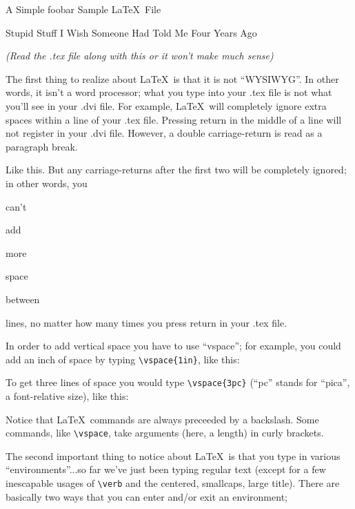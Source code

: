 \documentclass{article}
\begin{document}
\centerline{\sc \large A Simple foobar Sample \LaTeX\ File}
\vspace{.5pc}
\centerline{\sc Stupid Stuff I Wish Someone Had Told Me Four Years Ago}
\centerline{\it (Read the .tex file along with this or it won't 
            make much sense)}
\vspace{2pc}

The first thing to realize about \LaTeX\ is that it is not ``WYSIWYG''. 
In other words, it isn't a word processor; what you type into your 
.tex file is not what you'll see in your .dvi file.  For example, 
\LaTeX\ will      completely     ignore               extra
spaces    within                             a line of your .tex file.
Pressing return
in 
the 
middle 
of
a
line
will not register in your .dvi file. However, a double carriage-return
is read as a paragraph break.

Like this.  But any carriage-returns after the first two will be 
completely ignored; in other words, you 


can't 

add






more 




space 


between 




lines, no matter how many times you press return in your .tex file.

In order to add vertical space you have to use ``vspace''; for example, 
you could add an inch of space by typing \verb|\vspace{1in}|, like this:
\vspace{1in}

To get three lines of space you would type \verb|\vspace{3pc}|
(``pc'' stands for ``pica'', a font-relative size), like this:
\vspace{3pc}

Notice that \LaTeX\ commands are always preceeded by a backslash.  
Some commands, like \verb|\vspace|, take arguments (here, a length) in
curly brackets.  

The second important thing to notice about \LaTeX\ is that you type 
in various ``environments''...so far we've just been typing regular 
text (except for a few inescapable usages of \verb|\verb| and the
centered, smallcaps, large title).  There are basically two ways that 
you can enter and/or exit an environment;
\vspace{1pc}
\end{document}
